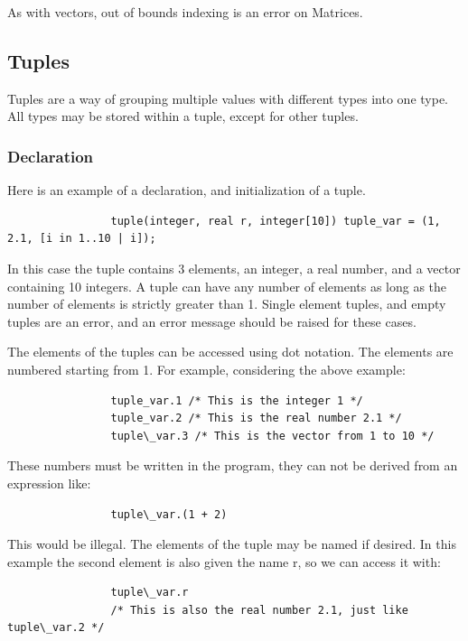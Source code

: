 \documentclass{article}
\begin{document}
			As with vectors, out of bounds indexing is an error on Matrices.


	\subsection{Tuples}\label{sec:tuple}

		Tuples are a way of grouping multiple values with different types into one type. All types may be stored within
		a tuple, except for other tuples.

		\subsubsection{Declaration}

			Here is an example of a declaration, and initialization of a tuple.

			\begin{lstlisting}
				tuple(integer, real r, integer[10]) tuple_var = (1, 2.1, [i in 1..10 | i]);
			\end{lstlisting}

			In this case the tuple contains 3 elements, an integer, a real number, and a vector containing 10 integers.
			A tuple can have any number of elements as long as the number of elements is strictly greater than 1. Single
			element tuples, and empty tuples are an error, and an error message should be raised for these cases.

			The elements of the tuples can be accessed using dot notation. The elements are numbered starting from 1.
			For example, considering the above example:

			\begin{lstlisting}
				tuple_var.1 /* This is the integer 1 */
				tuple_var.2 /* This is the real number 2.1 */
				tuple\_var.3 /* This is the vector from 1 to 10 */
			\end{lstlisting}

			These numbers must be written in the program, they can not be derived from an expression like:

			\begin{lstlisting}
				tuple\_var.(1 + 2)
			\end{lstlisting}

			This would be illegal. The elements of the tuple may be named if desired. In this example the second element
			is also given the name r, so we can access it with:

			\begin{lstlisting}
				tuple\_var.r
				/* This is also the real number 2.1, just like tuple\_var.2 */
			\end{lstlisting}
\end{document}
